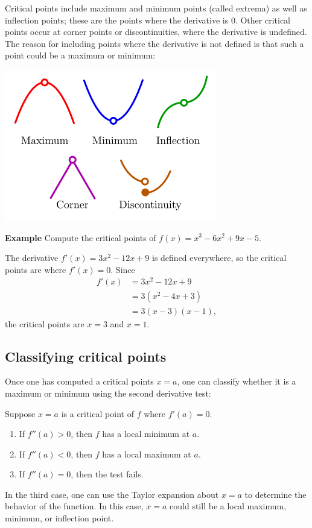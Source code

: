 \documentclass[twoside,openright,titlepage,a4paper]{book}
\begin{document}
\begin{sloppypar}
Critical points include maximum and minimum points (called extrema) as well as inflection points; these are the points where the derivative is 0. Other critical points occur at corner points or discontinuities, where the derivative is undefined. The reason for including points where the derivative is not defined is that such a point could be a maximum or minimum:
\begin{center}\includegraphics[scale=0.6]{CriticalPoints}\end{center}
\bigbreak
\textbf{Example} Compute the critical points of $f(x) = x^3 - 6x^2+9x-5$. 
\begin{examplebox}
The derivative $f'(x) = 3x^2 - 12x+9$ is defined everywhere, so the critical points are where $f'(x)=0$. Since
\begin{align*}
f'(x) &= 3x^2-12x+9 \\
&= 3(x^2-4x+3) \\
&= 3(x-3)(x-1),
\end{align*}
the critical points are $x=3$ and $x=1$.
\end{examplebox}
	
\subsection{Classifying critical points}

Once one has computed a critical points $x=a$, one can classify whether it is a maximum or minimum using the second derivative test:

\begin{definitionbox}[title=\textbf{Second Derivative Test}]
Suppose $x=a$ is a critical point of $f$ where $f'(a)=0$.
\begin{enumerate}
\item If $f''(a)>0$, then $f$ has a local minimum at $a$.
\item If $f''(a)<0$, then $f$ has a local maximum at $a$.
\item If $f''(a)=0$, then the test fails.
\end{enumerate}	
In the third case, one can use the Taylor expansion about $x=a$ to determine the behavior of the function. In this case, $x=a$ could still be a local maximum, minimum, or inflection point.
\end{definitionbox}
	

\end{sloppypar}
\end{document}
